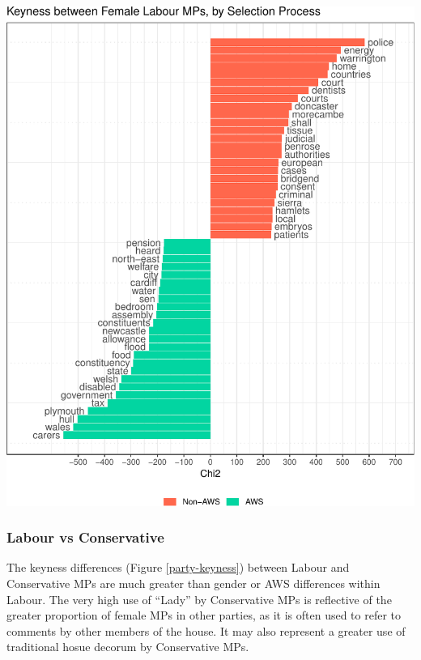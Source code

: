 \documentclass[]{article}
\let\origfigure\figure
\let\endorigfigure\endfigure
\renewenvironment{figure}[1][2] {
    \expandafter\origfigure\expandafter[H]
} {
    \endorigfigure
}
\begin{document}
\begin{figure}
\centering
\includegraphics{methodology_files/figure-latex/short-list-keyness-plot-1.pdf}
\caption{\label{sl-keyness}Keyness between Female Labour MPs, by
Selection Process}
\end{figure}

\hypertarget{labour-vs-conservative}{%
\subsubsection{Labour vs Conservative}\label{labour-vs-conservative}}

The keyness differences (Figure \ref{party-keyness}) between Labour and
Conservative MPs are much greater than gender or AWS differences within
Labour. The very high use of ``Lady'' by Conservative MPs is reflective
of the greater proportion of female MPs in other parties, as it is often
used to refer to comments by other members of the house. It may also
represent a greater use of traditional hosue decorum by Conservative
MPs.
\end{document}
